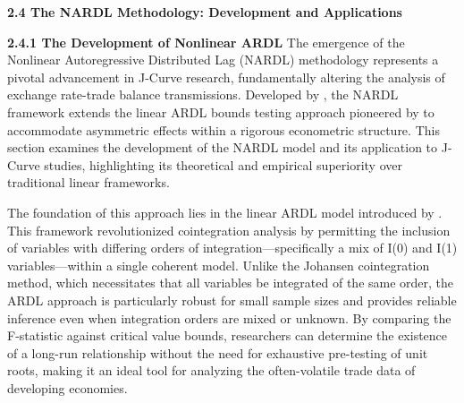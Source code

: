 \documentclass[12pt]{article}
\begin{document}
\vspace{0.5cm}
\noindent\textbf{2.4 The NARDL Methodology: Development and Applications}

\noindent\textbf{2.4.1 The Development of Nonlinear ARDL}
The emergence of the Nonlinear Autoregressive Distributed Lag (NARDL) methodology represents a pivotal advancement in J-Curve research, fundamentally altering the analysis of exchange rate-trade balance transmissions. Developed by \textcite{Shin2014-ap}, the NARDL framework extends the linear ARDL bounds testing approach pioneered by \textcite{Pesaran2001-kt} to accommodate asymmetric effects within a rigorous econometric structure. This section examines the development of the NARDL model and its application to J-Curve studies, highlighting its theoretical and empirical superiority over traditional linear frameworks.

The foundation of this approach lies in the linear ARDL model introduced by \textcite{Pesaran2001-kt}. This framework revolutionized cointegration analysis by permitting the inclusion of variables with differing orders of integration—specifically a mix of I(0) and I(1) variables—within a single coherent  model. Unlike the Johansen cointegration method, which necessitates that all variables be integrated of the same order, the ARDL approach is particularly robust for small sample sizes and provides reliable inference even when integration orders are mixed or unknown. By comparing the F-statistic against critical value bounds, researchers can determine the existence of a long-run relationship without the need for exhaustive pre-testing of unit roots, making it an ideal tool for analyzing the often-volatile trade data of developing economies.
\end{document}
